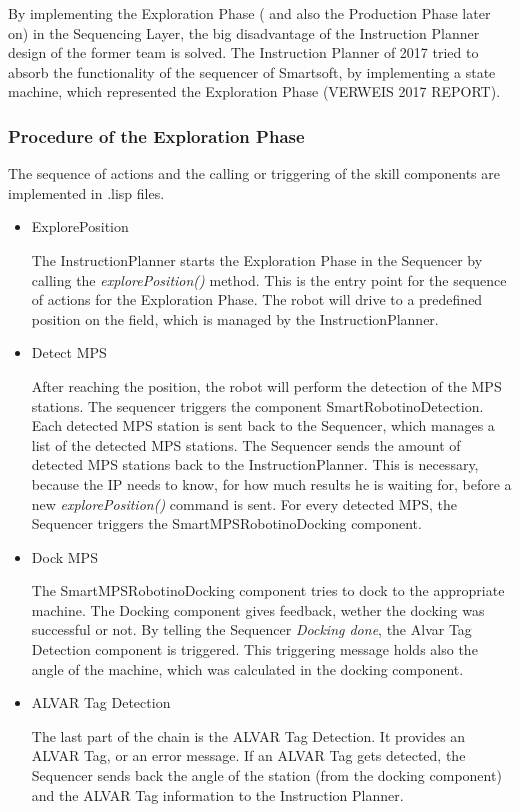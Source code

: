 By implementing the Exploration Phase ( and also the Production Phase later on) in the Sequencing Layer, the big disadvantage of the Instruction Planner design of the former team is solved. The Instruction Planner of 2017 tried to absorb the functionality of the sequencer of Smartsoft, by implementing a state machine, which represented the Exploration Phase (VERWEIS 2017 REPORT). 

\subsubsection{Procedure of the Exploration Phase}

The sequence of actions and the calling or triggering of the skill components are implemented in .lisp files.

\begin{itemize}

\item ExplorePosition

The InstructionPlanner starts the Exploration Phase in the Sequencer by calling the \textit{explorePosition()} method. This is the entry point for the sequence of actions for the Exploration Phase. The robot will drive to a predefined position on the field, which is managed by the InstructionPlanner.  

\item Detect MPS

After reaching the position, the robot will perform the detection of the MPS stations. The sequencer triggers the component SmartRobotinoDetection.
Each detected MPS station is sent back to the Sequencer, which manages a list of the detected MPS stations. 
The Sequencer sends the amount of detected MPS stations back to the InstructionPlanner. This is necessary, because the IP needs to know, for how much results he is waiting for, before a new \textit{explorePosition()} command is sent.
For every detected MPS, the Sequencer triggers the SmartMPSRobotinoDocking component.

\item Dock MPS

The SmartMPSRobotinoDocking component tries to dock to the appropriate machine. 
The Docking component gives feedback, wether the docking was successful or not. By telling the Sequencer \textit{Docking done}, the Alvar Tag Detection component is triggered. This triggering message holds also the angle of the machine, which was calculated in the docking component.

\item ALVAR Tag Detection

The last part of the chain is the ALVAR Tag Detection. It provides an ALVAR Tag, or an error message. 
If an ALVAR Tag gets detected, the Sequencer sends back the angle of the station (from the docking component) and the ALVAR Tag information to the Instruction Planner.

\end{itemize}